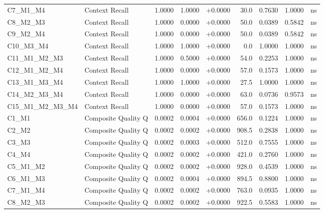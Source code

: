 \begin{table}[p]
\begin{tabular*}{\textwidth}{@{\extracolsep{\fill}} l l r r r r r r c @{}}
\addlinespace
C7\_M1\_M4      & Context Recall       & 1.0000 & 1.0000 & +0.0000 & 30.0 & 0.7630 & 1.0000 & ns \\
\addlinespace
C8\_M2\_M3      & Context Recall       & 1.0000 & 0.0000 & +0.0000 & 50.0 & 0.0389 & 0.5842 & ns \\
\addlinespace
C9\_M2\_M4      & Context Recall       & 1.0000 & 0.0000 & +0.0000 & 50.0 & 0.0389 & 0.5842 & ns \\
\addlinespace
C10\_M3\_M4     & Context Recall       & 1.0000 & 1.0000 & +0.0000 & 0.0 & 1.0000 & 1.0000 & ns \\
\addlinespace
C11\_M1\_M2\_M3 & Context Recall       & 1.0000 & 0.5000 & +0.0000 & 54.0 & 0.2253 & 1.0000 & ns \\
\addlinespace
C12\_M1\_M2\_M4 & Context Recall       & 1.0000 & 0.0000 & +0.0000 & 57.0 & 0.1573 & 1.0000 & ns \\
\addlinespace
C13\_M1\_M3\_M4 & Context Recall       & 1.0000 & 1.0000 & +0.0000 & 27.5 & 1.0000 & 1.0000 & ns \\
\addlinespace
C14\_M2\_M3\_M4 & Context Recall       & 1.0000 & 0.0000 & +0.0000 & 63.0 & 0.0736 & 0.9573 & ns \\
\addlinespace
C15\_M1\_M2\_M3\_M4 & Context Recall       & 1.0000 & 0.0000 & +0.0000 & 57.0 & 0.1573 & 1.0000 & ns \\
\addlinespace
C1\_M1          & Composite Quality Q  & 0.0002 & 0.0004 & +0.0000 & 656.0 & 0.1224 & 1.0000 & ns \\
\addlinespace
C2\_M2          & Composite Quality Q  & 0.0002 & 0.0002 & +0.0000 & 908.5 & 0.2838 & 1.0000 & ns \\
\addlinespace
C3\_M3          & Composite Quality Q  & 0.0002 & 0.0003 & +0.0000 & 512.0 & 0.7555 & 1.0000 & ns \\
\addlinespace
C4\_M4          & Composite Quality Q  & 0.0002 & 0.0002 & +0.0000 & 421.0 & 0.2760 & 1.0000 & ns \\
\addlinespace
C5\_M1\_M2      & Composite Quality Q  & 0.0002 & 0.0002 & +0.0000 & 928.0 & 0.4539 & 1.0000 & ns \\
\addlinespace
C6\_M1\_M3      & Composite Quality Q  & 0.0002 & 0.0004 & +0.0000 & 894.5 & 0.8800 & 1.0000 & ns \\
\addlinespace
C7\_M1\_M4      & Composite Quality Q  & 0.0002 & 0.0002 & +0.0000 & 763.0 & 0.0935 & 1.0000 & ns \\
\addlinespace
C8\_M2\_M3      & Composite Quality Q  & 0.0002 & 0.0002 & +0.0000 & 922.5 & 0.5583 & 1.0000 & ns \\

\end{tabular*}
\end{table}
